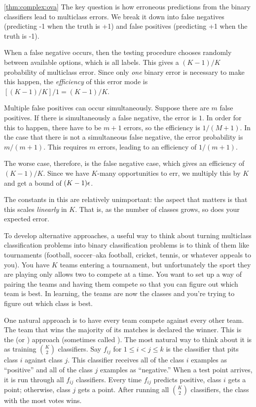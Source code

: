 \begin{myproof}{\ref{thm:complex:ova}}
  The key question is how erroneous predictions from the binary
  classifiers lead to multiclass errors.  We break it down into false
  negatives (predicting -1 when the truth is +1) and false positives
  (predicting +1 when the truth is -1).

  When a false negative occurs, then the testing procedure chooses
  randomly between available options, which is all labels.  This gives
  a $(K-1)/K$ probability of multiclass error.  Since only \emph{one}
  binary error is necessary to make this happen, the \emph{efficiency}
  of this error mode is $[ (K-1) / K ] / 1 = (K-1) / K$.

  Multiple false positives can occur simultaneously.  Suppose there
  are $m$ false positives.  If there is simultaneously a false
  negative, the error is $1$.  In order for this to happen, there have
  to be $m+1$ errors, so the efficiency is $1/(M+1)$.  In the case
  that there is not a simultaneous false negative, the error
  probability is $m/(m+1)$.  This requires $m$ errors, leading to an
  efficiency of $1/(m+1)$.

  The worse case, therefore, is the false negative case, which gives
  an efficiency of $(K-1)/K$.  Since we have $K$-many opportunities to
  err, we multiply this by $K$ and get a bound of $(K-1) \epsilon$.
\end{myproof}

The constants in this are relatively unimportant: the aspect that
matters is that this scales \emph{linearly} in $K$.  That is, as the
number of classes grows, so does your expected error.

To develop alternative approaches, a useful way to think about turning
multiclass classification problems into binary classification problems
is to think of them like tournaments (football, soccer--aka football,
cricket, tennis, or whatever appeals to you).  You have $K$ teams
entering a tournament, but unfortunately the sport they are playing
only allows two to compete at a time.  You want to set up a way of
pairing the teams and having them compete so that you can figure out
which team is best.  In learning, the teams are now the classes and
you're trying to figure out which class is best.

One natural approach is to have every team compete against every other
team.  The team that wins the majority of its matches is declared the
winner.  This is the  (or )
approach (sometimes called ).  The most natural way
to think about it is as training $K \choose 2$ classifiers.  Say
$f_{ij}$ for $1 \leq i < j \leq k$ is the classifier that pits class
$i$ against class $j$.  This classifier receives all of the class $i$
examples as ``positive'' and all of the class $j$ examples as
``negative.''  When a test point arrives, it is run through all
$f_{ij}$ classifiers.  Every time $f_{ij}$ predicts positive, class
$i$ gets a point; otherwise, class $j$ gets a point.  After running
all $K \choose 2$ classifiers, the class with the most votes wins.

